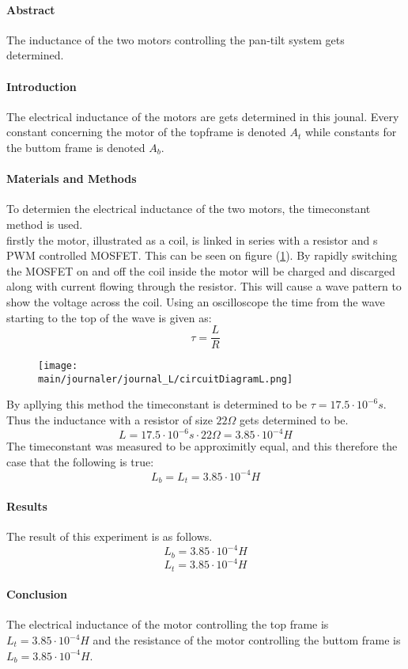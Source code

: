 \documentclass[../../main]{subfiles}
\begin{document}
\paragraph{Abstract}

The inductance of the two motors controlling the pan-tilt system gets determined.

\paragraph{Introduction}

The electrical inductance of the motors are gets determined in this jounal. Every constant concerning the motor of the topframe is denoted $A_t$ while constants for the buttom frame is denoted $A_b$.

\paragraph{Materials and Methods}

To determien the electrical inductance of the two motors, the timeconstant method is used.\\
firstly the motor, illustrated as a coil, is linked in series with a resistor and s PWM controlled MOSFET. This can be seen on figure (\ref{fig:inductance_circuit}). By rapidly switching the MOSFET on and off the coil inside the motor will be charged and discarged along with current flowing through the resistor. This will cause a wave pattern to show the voltage across the coil. Using an oscilloscope the time from the wave starting to the top of the wave is given as:
$$\tau = \frac{L}{R}$$

\begin{figure}[h]
  \label{fig:inductance_circuit}
  \begin{center}
    \texttt{[image: \\main/journaler/journal\_L/circuitDiagramL.png]}
  \end{center}
\end{figure}


By apllying this method the timeconstant is determined to be $\tau = 17.5 \cdot 10^{-6}s$. Thus the inductance with a resistor of size $22\Omega$ gets determined to be.\\
$$L = 17.5 \cdot 10^{-6}s \cdot 22 \Omega = 3.85 \cdot 10^{-4}H$$
The timeconstant was measured to be approximitly equal, and this therefore the case that the following is true:\\
$$L_b=L_t=3.85 \cdot 10^{-4}H$$

\paragraph{Results}

The result of this experiment is as follows.
$$L_b = 3.85 \cdot 10^{-4}H$$
$$L_t = 3.85 \cdot 10^{-4}H$$

\paragraph{Conclusion}

The electrical inductance of the motor controlling the top frame is $L_t= 3.85 \cdot 10^{-4}H$ and the resistance of the motor controlling the buttom frame is $L_b= 3.85 \cdot 10^{-4}H$.
\end{document}
